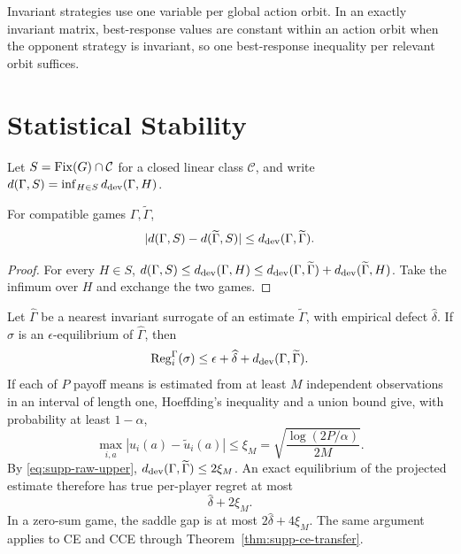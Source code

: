 Invariant strategies use one variable per global action orbit.  In an exactly invariant matrix, best-response values are constant within an action orbit when the opponent strategy is invariant, so one best-response inequality per relevant orbit suffices.

\section{Statistical Stability}

Let $S=\operatorname{Fix}(G)\cap\mathcal C$ for a closed linear class $\mathcal C$, and write $d(\Gamma,S)=\inf_{H\in S}d_{\mathrm{dev}}(\Gamma,H)$.

\begin{lemma}
\label{lem:supp-stability}
For compatible games $\Gamma,\widetilde\Gamma$,
\[
|d(\Gamma,S)-d(\widetilde\Gamma,S)|\le d_{\mathrm{dev}}(\Gamma,\widetilde\Gamma).
\]
\end{lemma}
\begin{proof}
For every $H\in S$,
$d(\Gamma,S)\le d_{\mathrm{dev}}(\Gamma,H)\le d_{\mathrm{dev}}(\Gamma,\widetilde\Gamma)+d_{\mathrm{dev}}(\widetilde\Gamma,H)$.  Take the infimum over $H$ and exchange the two games.
\end{proof}

Let $\widehat\Gamma$ be a nearest invariant surrogate of an estimate $\widetilde\Gamma$, with empirical defect $\widehat\delta$.  If $\sigma$ is an $\epsilon$-equilibrium of $\widehat\Gamma$, then
\[
\operatorname{Reg}_i^\Gamma(\sigma)
\le\epsilon+\widehat\delta+d_{\mathrm{dev}}(\Gamma,\widetilde\Gamma).
\]
If each of $P$ payoff means is estimated from at least $M$ independent observations in an interval of length one, Hoeffding's inequality and a union bound give, with probability at least $1-\alpha$,
\[
\max_{i,a}|u_i(a)-\widetilde u_i(a)|
\le\xi_M=\sqrt{\frac{\log(2P/\alpha)}{2M}}.
\]
By \eqref{eq:supp-raw-upper}, $d_{\mathrm{dev}}(\Gamma,\widetilde\Gamma)\le2\xi_M$.  An exact equilibrium of the projected estimate therefore has true per-player regret at most
\[
\widehat\delta+2\xi_M.
\]
In a zero-sum game, the saddle gap is at most $2\widehat\delta+4\xi_M$.  The same argument applies to CE and CCE through Theorem~\ref{thm:supp-ce-transfer}.

